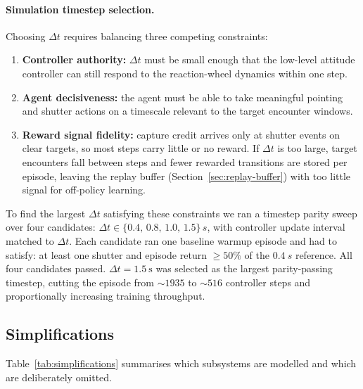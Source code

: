 \paragraph{Simulation timestep selection.}
Choosing $\Delta t$ requires balancing three competing constraints:
\begin{enumerate}
  \item \textbf{Controller authority:} $\Delta t$ must be small enough that the low-level attitude controller can still respond to the reaction-wheel dynamics within one step.
  \item \textbf{Agent decisiveness:} the agent must be able to take meaningful pointing and shutter actions on a timescale relevant to the target encounter windows.
  \item \textbf{Reward signal fidelity:} capture credit arrives only at shutter events on clear targets, so most steps carry little or no reward.
    If $\Delta t$ is too large, target encounters fall between steps and fewer rewarded transitions are stored per episode, leaving the replay buffer (Section~\ref{sec:replay-buffer}) with too little signal for off-policy learning.
\end{enumerate}
To find the largest $\Delta t$ satisfying these constraints we ran a timestep parity sweep over four candidates:
$\Delta t \in \{0.4,\,0.8,\,1.0,\,1.5\}\,\si{s}$, with controller update interval matched to $\Delta t$.
Each candidate ran one baseline warmup episode and had to satisfy: at least one shutter and episode return $\ge 50\%$ of the $\SI{0.4}{s}$ reference.
All four candidates passed.
$\Delta t = \SI{1.5}{\second}$ was selected as the largest parity-passing timestep, cutting the episode from $\sim 1935$ to $\sim 516$ controller steps and proportionally increasing training throughput.

\subsection{Simplifications}
\label{sec:simplifications}

Table~\ref{tab:simplifications} summarises which subsystems are modelled and which are deliberately omitted.

